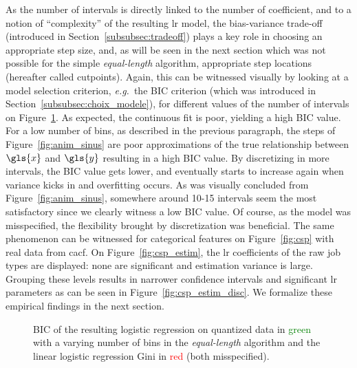 As the number of intervals is directly linked to the number of coefficient, and to a notion of ``complexity'' of the resulting \gls{lr} model, the bias-variance trade-off (introduced in Section~\ref{subsubsec:tradeoff}) plays a key role in choosing an appropriate step size, and, as will be seen in the next section which was not possible for the simple \textit{equal-length} algorithm, appropriate step locations (hereafter called cutpoints). Again, this can be witnessed visually by looking at a model selection criterion, \textit{e.g.}\ the BIC criterion (which was introduced in Section~\ref{subsubsec:choix_modele}), for different values of the number of intervals on Figure~\ref{fig:bic_sin}. As expected, the continuous fit is poor, yielding a high BIC value. For a low number of bins, as described in the previous paragraph, the steps of Figure~\ref{fig:anim_sinus} are poor approximations of the true relationship between $\gls{x}$ and $\gls{y}$ resulting in a high BIC value. By discretizing in more intervals, the BIC value gets lower, and eventually starts to increase again when variance kicks in and overfitting occurs. As was visually concluded from Figure~\ref{fig:anim_sinus}, somewhere around 10-15 intervals seem the most satisfactory since we clearly witness a low BIC value. Of course, as the model was misspecified, the flexibility brought by discretization was beneficial. The same phenomenon can be witnessed for categorical features on Figure~\ref{fig:csp} with real data from \gls{cacf}. On Figure~\ref{fig:csp_estim}, the \gls{lr} coefficients of the raw job types are displayed: none are significant and estimation variance is large. Grouping these levels results in narrower confidence intervals and significant \gls{lr} parameters as can be seen in Figure~\ref{fig:csp_estim_disc}.
We formalize these empirical findings in the next section.



\begin{figure}[!ht]
\centering \resizebox{.8\textwidth}{!}{}
\caption{\label{fig:bic_sin} BIC of the resulting logistic regression on quantized data in \textcolor{green}{green} with a varying number of bins in the \textit{equal-length} algorithm and the linear logistic regression Gini in \textcolor{red}{red} (both misspecified).}
\end{figure}



